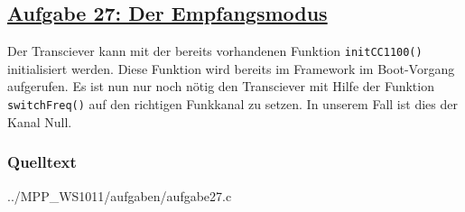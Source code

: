 \subsection
{\href{http://cst.mi.fu-berlin.de/intern/19606-P-MPP/Aufgaben/041101.html}
{Aufgabe 27: Der Empfangsmodus}}

Der Transciever kann mit der bereits vorhandenen Funktion \texttt{initCC1100()}
initialisiert werden. Diese Funktion wird bereits im Framework im Boot-Vorgang aufgerufen. 
Es ist nun nur noch nötig den Transciever mit Hilfe der Funktion \texttt{switchFreq()}
auf den richtigen Funkkanal zu setzen. In unserem Fall ist dies der Kanal Null. 

\subsubsection*{Quelltext}


{../MPP_WS1011/aufgaben/aufgabe27.c}
